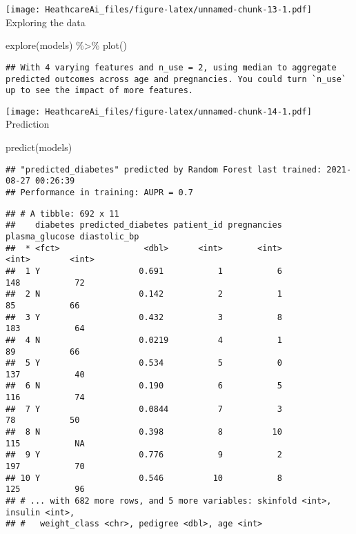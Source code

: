 \documentclass[
]{article}
\newenvironment{Shaded}{\begin{snugshade}}{\end{snugshade}}
\newcommand{\FunctionTok}[1]{\textcolor[rgb]{0.00,0.00,0.00}{#1}}
\newcommand{\NormalTok}[1]{#1}
\newcommand{\SpecialCharTok}[1]{\textcolor[rgb]{0.00,0.00,0.00}{#1}}
\begin{document}
\texttt{[image: HeathcareAi\_files/figure-latex/unnamed-chunk-13-1.pdf]}
Exploring the data

\begin{Shaded}
\begin{Highlighting}[]
\FunctionTok{explore}\NormalTok{(models) }\SpecialCharTok{\%\textgreater{}\%}
  \FunctionTok{plot}\NormalTok{()}
\end{Highlighting}
\end{Shaded}

\begin{verbatim}
## With 4 varying features and n_use = 2, using median to aggregate predicted outcomes across age and pregnancies. You could turn `n_use` up to see the impact of more features.
\end{verbatim}

\texttt{[image: HeathcareAi\_files/figure-latex/unnamed-chunk-14-1.pdf]}
Prediction

\begin{Shaded}
\begin{Highlighting}[]
\FunctionTok{predict}\NormalTok{(models)}
\end{Highlighting}
\end{Shaded}

\begin{verbatim}
## "predicted_diabetes" predicted by Random Forest last trained: 2021-08-27 00:26:39
## Performance in training: AUPR = 0.7
\end{verbatim}

\begin{verbatim}
## # A tibble: 692 x 11
##    diabetes predicted_diabetes patient_id pregnancies plasma_glucose diastolic_bp
##  * <fct>                 <dbl>      <int>       <int>          <int>        <int>
##  1 Y                    0.691           1           6            148           72
##  2 N                    0.142           2           1             85           66
##  3 Y                    0.432           3           8            183           64
##  4 N                    0.0219          4           1             89           66
##  5 Y                    0.534           5           0            137           40
##  6 N                    0.190           6           5            116           74
##  7 Y                    0.0844          7           3             78           50
##  8 N                    0.398           8          10            115           NA
##  9 Y                    0.776           9           2            197           70
## 10 Y                    0.546          10           8            125           96
## # ... with 682 more rows, and 5 more variables: skinfold <int>, insulin <int>,
## #   weight_class <chr>, pedigree <dbl>, age <int>
\end{verbatim}
\end{document}
